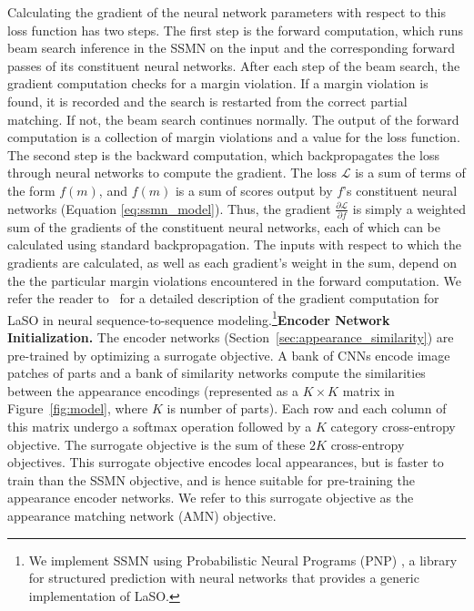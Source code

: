 \documentclass[10pt,twocolumn,letterpaper]{article}
\begin{document}
Calculating the gradient of the neural network parameters with respect to this loss function has two steps. The first step is the forward computation, which runs beam search inference in the SSMN on the input and the corresponding forward passes of its constituent neural networks. After each step of the beam search, the gradient computation checks for a margin violation. If a margin violation is found, it is recorded and the search is restarted from the correct partial matching.
If not, the beam search continues normally. The output of the forward computation is a collection of margin violations and a value for the loss function. The second step is the backward computation, which backpropagates the loss through neural networks to compute the gradient. The loss $\mathcal{L}$ is a sum of terms of the form $f(m)$, and $f(m)$ is a sum of scores output by $f$'s constituent neural networks (Equation \ref{eq:ssmn_model}). Thus, the gradient $\frac{\partial \mathcal{L}}{\partial f}$ is simply a weighted sum of the gradients of the constituent neural networks, each of which can be calculated using standard backpropagation. The inputs with respect to which the gradients are calculated, as well as each gradient's weight in the sum, depend on the the particular margin violations encountered in the forward computation.
We refer the reader to~\cite{Wiseman2016SequencetoSequenceLA} for a detailed description of the gradient computation for LaSO in neural sequence-to-sequence modeling.\footnote{
We implement SSMN using Probabilistic Neural Programs (PNP) \cite{Murray2016}, a library for structured prediction with neural networks that provides a generic implementation of LaSO. %
}\vspace{.5em}\noindent\textbf{Encoder Network Initialization.}
The encoder networks (Section~\ref{sec:appearance_similarity}) are pre-trained by optimizing a surrogate objective. A bank of CNNs encode image patches of parts and a bank of similarity networks compute the similarities between the appearance encodings (represented as a $K \times K$ matrix in Figure~\ref{fig:model}, where $K$ is number of parts). Each row and each column of this matrix undergo a softmax operation followed by a $K$ category cross-entropy objective. The surrogate objective is the sum of these $2K$ cross-entropy objectives. This surrogate objective encodes local appearances, but is faster to train than the SSMN objective, and is hence suitable for pre-training the appearance encoder networks. We refer to this surrogate objective as the appearance matching network (AMN) objective.
\end{document}

